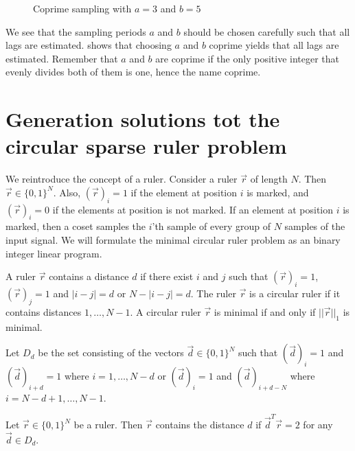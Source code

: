 \documentclass[a4paper, openany, oneside]{memoir}
\begin{document}
\begin{figure}
\caption{Coprime sampling with $a=3$ and $b=5$}\label{tkz:coprime_ruler}
\end{figure}

We see that the sampling periods $a$ and $b$ should be chosen carefully such that all lags are estimated. \cite{pal2011coprime} shows that choosing $a$ and $b$ coprime yields that all lags are estimated. Remember that $a$ and $b$ are coprime if the only positive integer that evenly divides both of them is one, hence the name coprime.




\chapter{Generation solutions tot the circular sparse ruler problem}\label{ap:derivation_ILP}
We reintroduce the concept of a ruler. Consider a ruler $\vec{r}$ of length $N$. Then $\vec{r} \in \{0,1\}^N$. Also, $(\vec{r})_i = 1$ if the element at position $i$ is marked, and $(\vec{r})_i = 0$ if the elements at position is not marked. If an element at position $i$ is marked, then a coset samples the $i$'th sample of every group of $N$ samples of the input signal. We will formulate the minimal circular ruler problem as an binary integer linear program.

A ruler $\vec{r}$ contains a distance $d$ if there exist $i$ and $j$ such that $(\vec{r})_i = 1$, $(\vec{r})_j = 1$ and $|i-j| = d$ or  $N-|i-j| = d$. The ruler $\vec{r}$ is a circular ruler if it contains distances $ 1, \ldots, N - 1$. A circular ruler $\vec{r}$ is minimal if and only if $||\vec{r}||_1$ is minimal.

Let $D_d$ be the set consisting of the vectors $\vec{d} \in \{0,1\}^N$ such that $(\vec{d})_i=1$ and $(\vec{d})_{i+d}=1$ where $i = 1,\ldots,N-d$ or $(\vec{d})_i=1$ and $(\vec{d})_{i+d-N}$ where $i = N-d+1,\ldots,N-1$.

\begin{blockTheorem} \label{th:ruler-distance}\nolinebreak
    Let $\vec{r} \in \{0,1\}^N$ be a ruler. Then $\vec{r}$ contains the distance $d$ if $\vec{d}^T \vec{r} = 2$ for any $\vec{d} \in D_d$.\nolinebreak
\end{blockTheorem}
\end{document}
